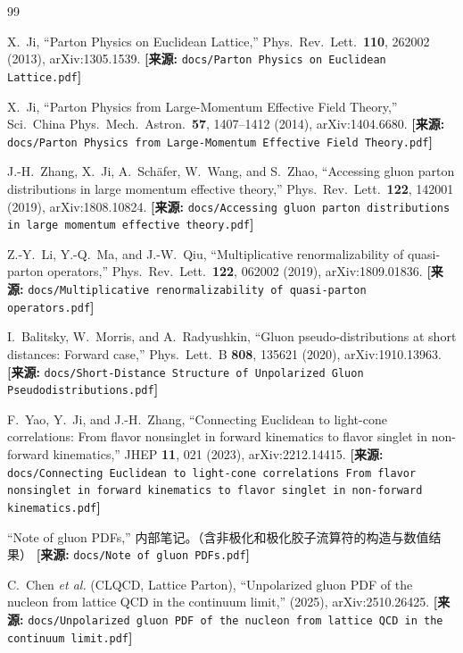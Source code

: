 \documentclass[12pt,a4paper]{ctexart}
\theoremstyle{definition}
\begin{document}
\begin{thebibliography}{99}

X.~Ji,
``Parton Physics on Euclidean Lattice,''
Phys.\ Rev.\ Lett.\ \textbf{110}, 262002 (2013), arXiv:1305.1539.
\quad\textbf{[来源:} \texttt{docs/Parton Physics on Euclidean Lattice.pdf}\textbf{]}

X.~Ji,
``Parton Physics from Large-Momentum Effective Field Theory,''
Sci.\ China Phys.\ Mech.\ Astron.\ \textbf{57}, 1407--1412 (2014), arXiv:1404.6680.
\quad\textbf{[来源:} \texttt{docs/Parton Physics from Large-Momentum Effective Field Theory.pdf}\textbf{]}

J.-H.~Zhang, X.~Ji, A.~Sch\"afer, W.~Wang, and S.~Zhao,
``Accessing gluon parton distributions in large momentum effective theory,''
Phys.\ Rev.\ Lett.\ \textbf{122}, 142001 (2019), arXiv:1808.10824.
\quad\textbf{[来源:} \texttt{docs/Accessing gluon parton distributions in large momentum effective theory.pdf}\textbf{]}

Z.-Y.~Li, Y.-Q.~Ma, and J.-W.~Qiu,
``Multiplicative renormalizability of quasi-parton operators,''
Phys.\ Rev.\ Lett.\ \textbf{122}, 062002 (2019), arXiv:1809.01836.
\quad\textbf{[来源:} \texttt{docs/Multiplicative renormalizability of quasi-parton operators.pdf}\textbf{]}

I.~Balitsky, W.~Morris, and A.~Radyushkin,
``Gluon pseudo-distributions at short distances: Forward case,''
Phys.\ Lett.\ B \textbf{808}, 135621 (2020), arXiv:1910.13963.
\quad\textbf{[来源:} \texttt{docs/Short-Distance Structure of Unpolarized Gluon Pseudodistributions.pdf}\textbf{]}

F.~Yao, Y.~Ji, and J.-H.~Zhang,
``Connecting Euclidean to light-cone correlations: From flavor nonsinglet in forward kinematics to flavor singlet in non-forward kinematics,''
JHEP \textbf{11}, 021 (2023), arXiv:2212.14415.
\quad\textbf{[来源:} \texttt{docs/Connecting Euclidean to light-cone correlations From flavor nonsinglet in forward kinematics to flavor singlet in non-forward kinematics.pdf}\textbf{]}

``Note of gluon PDFs,''
内部笔记。（含非极化和极化胶子流算符的构造与数值结果）
\quad\textbf{[来源:} \texttt{docs/Note of gluon PDFs.pdf}\textbf{]}

C.~Chen \textit{et al.} (CLQCD, Lattice Parton),
``Unpolarized gluon PDF of the nucleon from lattice QCD in the continuum limit,''
(2025), arXiv:2510.26425.
\quad\textbf{[来源:} \texttt{docs/Unpolarized gluon PDF of the nucleon from lattice QCD in the continuum limit.pdf}\textbf{]}


\end{thebibliography}
\end{document}
